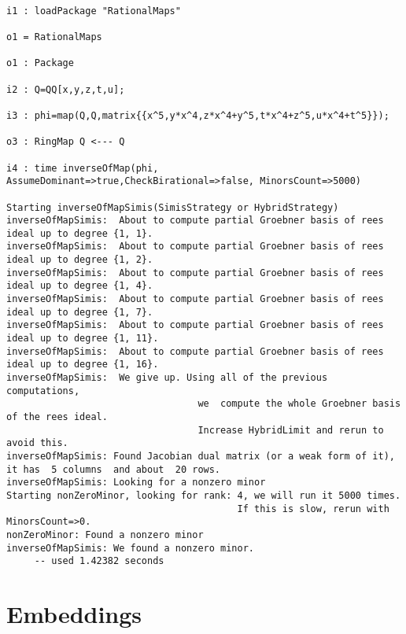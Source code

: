 \documentclass[12pt]{amsart}
\numberwithin{equation}{theorem}
\renewcommand{\:}{\colon}
\theoremstyle{theorem}
\begin{document}
\scriptsize{
\begin{verbatim}

i1 : loadPackage "RationalMaps"

o1 = RationalMaps

o1 : Package

i2 : Q=QQ[x,y,z,t,u];

i3 : phi=map(Q,Q,matrix{{x^5,y*x^4,z*x^4+y^5,t*x^4+z^5,u*x^4+t^5}});

o3 : RingMap Q <--- Q

i4 : time inverseOfMap(phi, AssumeDominant=>true,CheckBirational=>false, MinorsCount=>5000)

Starting inverseOfMapSimis(SimisStrategy or HybridStrategy)
inverseOfMapSimis:  About to compute partial Groebner basis of rees ideal up to degree {1, 1}.
inverseOfMapSimis:  About to compute partial Groebner basis of rees ideal up to degree {1, 2}.
inverseOfMapSimis:  About to compute partial Groebner basis of rees ideal up to degree {1, 4}.
inverseOfMapSimis:  About to compute partial Groebner basis of rees ideal up to degree {1, 7}.
inverseOfMapSimis:  About to compute partial Groebner basis of rees ideal up to degree {1, 11}.
inverseOfMapSimis:  About to compute partial Groebner basis of rees ideal up to degree {1, 16}.
inverseOfMapSimis:  We give up. Using all of the previous computations,
                                  we  compute the whole Groebner basis of the rees ideal. 
                                  Increase HybridLimit and rerun to avoid this.
inverseOfMapSimis: Found Jacobian dual matrix (or a weak form of it), it has  5 columns  and about  20 rows.
inverseOfMapSimis: Looking for a nonzero minor
Starting nonZeroMinor, looking for rank: 4, we will run it 5000 times. 
                                         If this is slow, rerun with MinorsCount=>0.
nonZeroMinor: Found a nonzero minor
inverseOfMapSimis: We found a nonzero minor.
     -- used 1.42382 seconds

    \end{verbatim}}

\section{Embeddings}



\end{document}
